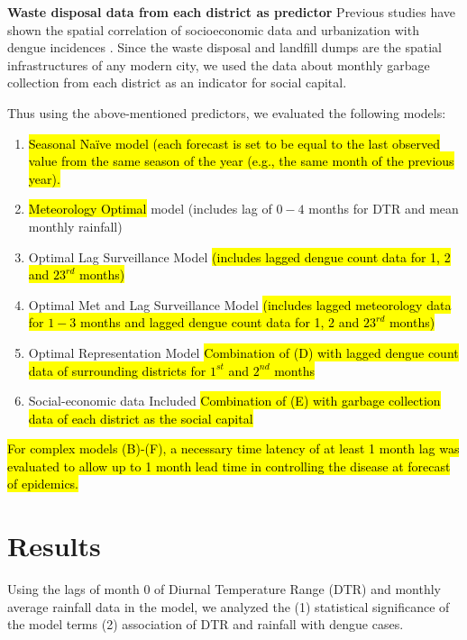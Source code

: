 \documentclass{bmcart}
\begin{document}
\textbf{Waste disposal data from each district as predictor} Previous studies have shown the spatial correlation of socioeconomic data and urbanization with dengue incidences \cite{mondini2008spatial,wu2009higher}. Since the waste disposal and landfill dumps are the spatial infrastructures of any modern city, we used the data about monthly garbage collection from each district as an indicator for social capital. 

Thus using the above-mentioned predictors, we evaluated the following models: 
\begin{enumerate}[label=(\Alph*)]
	\item \hl{Seasonal Na\"{i}ve model (each forecast is set to be equal to the last observed value from the same season of the year (e.g., the same month of the previous year).}
	\item \hl{Meteorology Optimal} model (includes lag of $0-4$ months for DTR and mean monthly rainfall)
	\item Optimal Lag Surveillance Model \hl{(includes lagged dengue count data for 1, 2 and $23^{rd}$ months)}
	\item Optimal Met and Lag Surveillance Model \hl{(includes lagged meteorology data for $1-3$ months and  lagged dengue count data for 1, 2 and $23^{rd}$ months)}
	\item Optimal Representation Model \hl{Combination of (D) with lagged dengue count data of surrounding districts for $1^{st}$ and $2^{nd}$ months} 
	\item Social-economic data Included \hl{Combination of (E) with garbage collection data of each district as the social capital} 
\end{enumerate}

\hl{For complex models (B)-(F), a necessary time latency of at least 1 month lag was evaluated to allow up to 1 month lead time in controlling the disease at forecast of epidemics.}




\section{Results} \label{results}


Using the lags of month 0 of Diurnal Temperature Range (DTR) and monthly average rainfall data in the model, we analyzed the (1) statistical significance of the model terms (2) association of DTR and rainfall with dengue cases. 
\end{document}
